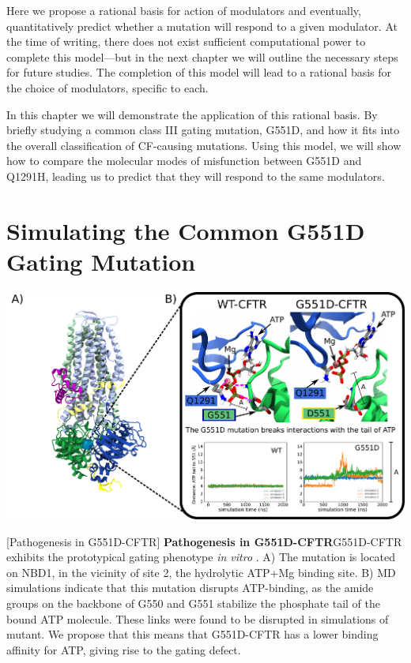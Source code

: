 Here we propose a rational basis for action of modulators and eventually, quantitatively predict whether a mutation will respond to a given modulator. At the time of writing, there does not exist sufficient computational power to complete this model---but in the next chapter we will outline the necessary steps for future studies. The completion of this model will lead to a rational basis for the choice of modulators, specific to each. 

In this chapter we will demonstrate the application of this rational basis. By briefly studying a common class III gating mutation, G551D, and how it fits into the overall classification of CF-causing mutations. Using this model, we will show how to compare the molecular modes of misfunction between G551D and Q1291H, leading us to predict that they will respond to the same modulators. 

\section{Simulating the Common G551D Gating Mutation}

	\begin{center}
		\includegraphics[width=\textwidth]{figures/perspective/G551D.pdf}
	\end{center}

\begingroup
\captionsetup{singlelinecheck = false, justification=raggedright}
[Pathogenesis in G551D-CFTR] {\textbf{Pathogenesis in G551D-CFTR}}{G551D-CFTR exhibits the prototypical gating phenotype \textit{in vitro} \cite{bompadre2007, wang2020}. A) The mutation is located on NBD1, in the vicinity of site 2, the hydrolytic ATP+Mg binding site. B) MD simulations indicate that this mutation disrupts ATP-binding, as the amide groups on the backbone of G550 and G551 stabilize the phosphate tail of the bound ATP molecule. These links were found to be disrupted in simulations of mutant. We propose that this means that G551D-CFTR has a lower binding affinity for ATP, giving rise to the gating defect.} 
\label{G551D_results}
\endgroup

